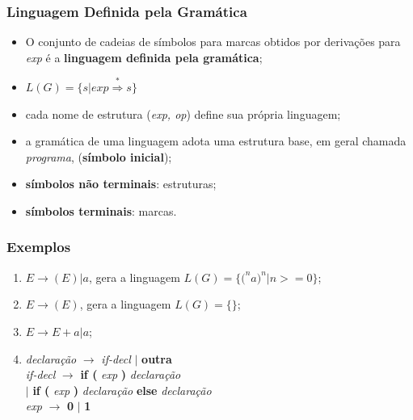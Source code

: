 \documentclass[table]{beamer}
\begin{document}
\begin{frame}
   \frametitle{Linguagem Definida pela Gramática}
   \begin{itemize}
      \item O conjunto de cadeias de símbolos para marcas obtidos por derivações para \textit{exp} é a \textbf{linguagem definida pela gramática};
      \item $L(G) = \{s|exp \overset{*}{\Rightarrow} s\}$
      \item cada nome de estrutura (\textit{exp, op}) define sua própria linguagem;
      \item a gramática de uma linguagem adota uma estrutura base, em geral chamada \textit{programa}, (\textbf{símbolo inicial});
      \item \textbf{símbolos não terminais}: estruturas;
      \item \textbf{símbolos terminais}: marcas.
   \end{itemize}
\end{frame}

\begin{frame}
   \frametitle{Exemplos}
   \begin{enumerate}
      \item $E \to (E)|a$, gera a linguagem $L(G) = \{{(}^{n} a {)}^{n} | n >= 0\}$;
      \item $E \to (E)$, gera a linguagem $L(G)=\{\}$;
      \item $E \to E + a | a$;
      \item \textit{declaração} $\to$ \textit{if-decl} $|$ \textbf{outra} \\
      \textit{if-decl} $\to$ \textbf{if (} \textit{exp} \textbf{)} \textit{declaração} \\
      \hspace{1.3cm} $|$ \textbf{if (} \textit{exp} \textbf{)} \textit{declaração} \textbf{else} \textit{declaração} \\
      \textit{exp} $\to$ \textbf{0} $|$ \textbf{1}
   \end{enumerate}
\end{frame}
\end{document}

